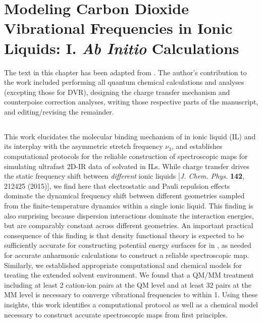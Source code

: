 \chapter[\ce{CO2}-IL Cluster Model Validation]{Modeling Carbon Dioxide Vibrational Frequencies in Ionic Liquids: I. \textit{Ab Initio} Calculations}
\label{ch:paper_02}

The text in this chapter has been adapted from . The author's contribution to the work included performing all quantum chemical calculations and analyses (excepting those for DVR), designing the charge transfer mechanism and counterpoise correction analyses, writing those respective parts of the manuscript, and editing/revising the remainder.

\section{\texorpdfstring{}{Summary}}
\label{paper_02:sec:summary}

This work elucidates the molecular binding mechanism of  in \ce{[C4C1im][PF6]} ionic liquid (IL) and its interplay with the  asymmetric stretch frequency \(\nu_{3}\), and establishes computational protocols for the reliable construction of spectroscopic maps for simulating ultrafast 2D-IR data of  solvated in ILs. While charge transfer drives the static frequency shift between \emph{different} ionic liquids [\emph{J. Chem. Phys.} \textbf{142}, 212425 (2015)], we find here that electrostatic and Pauli repulsion effects dominate the dynamical frequency shift between different geometries sampled from the finite-temperature dynamics within a single ionic liquid. This finding is also surprising because dispersion interactions dominate the \cotil interaction energies, but are comparably constant across different geometries. An important practical consequence of this finding is that density functional theory is expected to be sufficiently accurate for constructing potential energy surfaces for  in \ce{[C4C1im][PF6]}, as needed for accurate anharmonic calculations to construct a reliable spectroscopic map. Similarly, we established appropriate computational and chemical models for treating the extended solvent environment. We found that a QM/MM treatment including at least \num{2} cation-ion pairs at the QM level and at least \num{32} pairs at the MM level is necessary to converge vibrational frequencies to within \SI{1}{\wavenumber}. Using these insights, this work identifies a computational protocol as well as a chemical model necessary to construct accurate spectroscopic maps from first principles.

